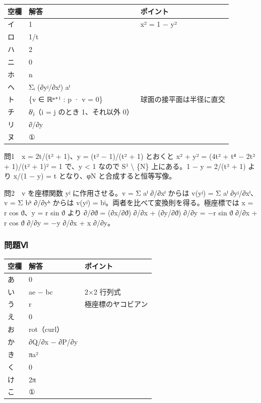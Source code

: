 \documentclass[
  10pt,
  a4paper,
]{article}
\begin{document}
\begin{longtable}[]{@{}lll@{}}
\toprule\noalign{}
空欄 & 解答 & ポイント \\
\midrule\noalign{}
\endhead
\bottomrule\noalign{}
\endlastfoot
イ & 1 & x² = 1 − y² \\
ロ & 1/t & \\
ハ & 2 & \\
ニ & 0 & \\
ホ & n & \\
ヘ & Σ{\fallbackfont ᵢ} (∂y{\fallbackfont ʲ}/∂x{\fallbackfont ⁱ})
a{\fallbackfont ⁱ} & \\
ト & \{v ∈ {\fallbackfont ℝⁿ⁺}¹ : p · v = 0\} &
球面の接平面は半径に直交 \\
チ & δ{\fallbackfont ⁱⱼ}（i = j のとき 1、それ以外 0） & \\
リ & ∂/∂y & \\
ヌ & ① & \\
\end{longtable}

問1　x = 2t/(t² + 1)、y = (t² − 1)/(t² + 1) とおくと x² + y² = (4t² +
t{\fallbackfont ⁴} − 2t² + 1)/(t² + 1)² = 1 で、y \textless{} 1 なので
S¹ \textbackslash{} \{N\} 上にある。1 − y = 2/(t² + 1) より x/(1 − y) =
t となり、φN と合成すると恒等写像。

問2　v を座標関数 y{\fallbackfont ʲ} に作用させる。v = Σ
a{\fallbackfont ⁱ} ∂/∂x{\fallbackfont ⁱ} からは v(y{\fallbackfont ʲ}) =
Σ a{\fallbackfont ⁱ} ∂y{\fallbackfont ʲ}/∂x{\fallbackfont ⁱ}、v = Σ
b{\fallbackfont ᵏ} ∂/∂y{\fallbackfont ᵏ} からは v(y{\fallbackfont ʲ}) =
b{\fallbackfont ʲ}。両者を比べて変換則を得る。極座標では x = r cos
{\fallbackfont ϑ}、y = r sin {\fallbackfont ϑ} より ∂/∂{\fallbackfont ϑ}
= (∂x/∂{\fallbackfont ϑ}) ∂/∂x + (∂y/∂{\fallbackfont ϑ}) ∂/∂y = −r sin
{\fallbackfont ϑ} ∂/∂x + r cos {\fallbackfont ϑ} ∂/∂y = −y ∂/∂x + x
∂/∂y。

\hypertarget{ux554fux984cux2175}{%
\subsubsection{問題Ⅵ}\label{ux554fux984cux2175}}

\begin{longtable}[]{@{}lll@{}}
\toprule\noalign{}
空欄 & 解答 & ポイント \\
\midrule\noalign{}
\endhead
\bottomrule\noalign{}
\endlastfoot
あ & 0 & \\
い & ae − bc & 2×2 行列式 \\
う & r & 極座標のヤコビアン \\
え & 0 & \\
お & rot（curl） & \\
か & ∂Q/∂x − ∂P/∂y & \\
き & πa² & \\
く & 0 & \\
け & 2π & \\
こ & ① & \\
\end{longtable}
\end{document}
